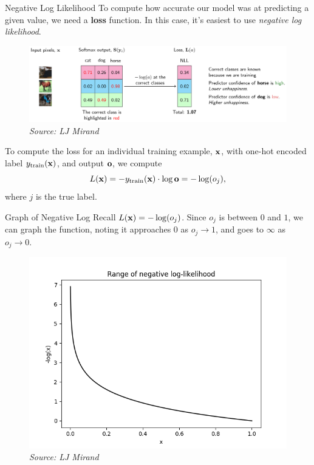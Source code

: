 \documentclass[xcolor=dvipsnames, fontsize=11pt, %
pagesize, %
parskip=half-, t]{beamer}
\begin{document}
 \begin{frame}{Negative Log Likelihood}
 To compute how accurate our model was at predicting a given value, we need a \textbf{loss} function. In this case, it's easiest to use \textit{negative log likelihood}.  \pause
 \begin{figure}[H] \center \includegraphics[scale=0.15]{neg_log_demo.png}
 \caption{\textit{Source: LJ Mirand}} \end{figure} \pause 
To compute the loss for an individual training example, $\bold{x}$, with one-hot encoded label $y_{\text{train}}(\bold{x})$, and output $\bold{o}$, we compute $$L(\bold{x})=-y_{\text{train}}(\bold{x})\cdot \log \bold{o}=-\log(o_j),$$ where $j$ is the true label.
 \end{frame}
 \begin{frame}{Graph of Negative Log}
Recall $L(\bold{x})=-\log(o_j)$. Since $o_j$ is between $0$ and $1$, we can graph the function, noting it approaches $0$ as $o_j\to 1$, and goes to $\infty$ as $o_j\to 0$.
\begin{figure}[H] \center \includegraphics[scale=0.45]{neg_log.png}
\caption{\textit{Source:  LJ Mirand}}\end{figure}
 \end{frame}
\end{document}
